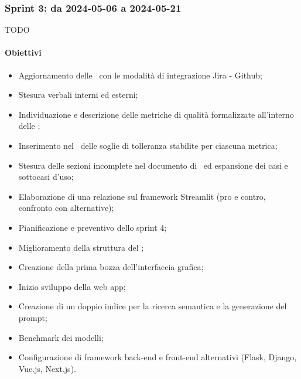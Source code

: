 \subsubsection{Sprint 3: da 2024-05-06 a 2024-05-21}
TODO

\paragraph{Obiettivi}
\begin{itemize}
  \item Aggiornamento delle \NdP\ con le modalità di integrazione Jira - Github;
  \item Stesura verbali interni ed esterni;
  \item Individuazione e descrizione delle metriche di qualità formalizzate all'interno delle \NdP;
  \item Inserimento nel \PdQ\ delle soglie di tolleranza stabilite per ciascuna metrica;
  \item Stesura delle sezioni incomplete nel documento di \AdR\ ed espansione dei casi e sottocasi d'uso;
  \item Elaborazione di una relazione sul framework Streamlit (pro e contro, confronto con alternative);
  \item Pianificazione e preventivo dello sprint 4;
  \item Miglioramento della struttura del \PdP;
  \item Creazione della prima bozza dell'interfaccia grafica;
  \item Inizio sviluppo della web app;
  \item Creazione di un doppio indice per la ricerca semantica e la generazione del prompt;
  \item Benchmark dei modelli;
  \item Configurazione di framework back-end e front-end alternativi (Flask, Django, Vue.js, Next.js).
\end{itemize}

\vspace{0.5\baselineskip}
\par [Inserire Gantt]